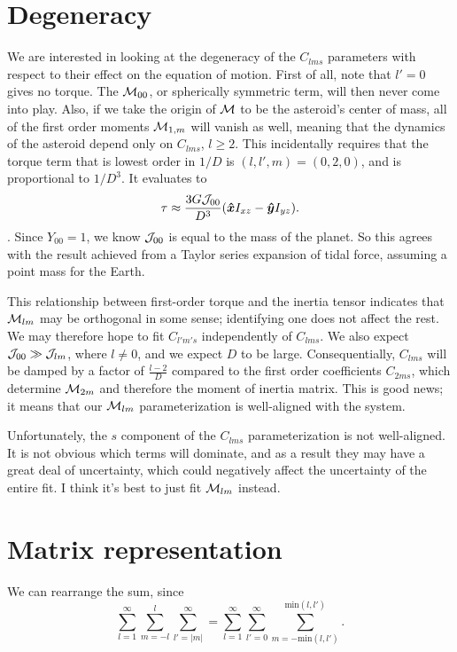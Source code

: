\documentclass[aps,twocolumn,secnumarabic,balancelastpage,amsmath,amssymb,nofootinbib,floatfix]{revtex4-1}
\begin{document}
\section{Degeneracy}
We are interested in looking at the degeneracy of the $C_{lms}$ parameters with respect to their effect on the equation of motion. First of all, note that $l'=0$ gives no torque. The $\mathcal{M}_{00}$, or spherically symmetric term, will then never come into play. Also, if we take the origin of $\mathcal{M}$ to be the asteroid's center of mass, all of the first order moments $\mathcal{M}_{1,m}$ will vanish as well, meaning that the dynamics of the asteroid depend only on $C_{lms}$, $l\geq 2$. This incidentally requires that the torque term that is lowest order in $1/D$ is $(l,l',m)=(0,2,0)$, and is proportional to $1/D^3.$ It evaluates to
$$\tau \approx \frac{3G\mathcal{J}_{00}}{D^3}(\bm{\hat x} I_{xz}-\bm{\hat y} I_{yz}).$$
. Since $Y_{00}=1$, we know $\mathcal{J}_{00}$ is equal to the mass of the planet. So this agrees with the result achieved from a Taylor series expansion of tidal force, assuming a point mass for the Earth.

This relationship between first-order torque and the inertia tensor indicates that $\mathcal{M}_{lm}$ may be orthogonal in some sense; identifying one does not affect the rest. We may therefore hope to fit $C_{l'm's}$ independently of $C_{lms}$. We also expect $\mathcal{J}_{00}\gg \mathcal{J}_{lm}$, where $l\neq 0$, and we expect $D$ to be large. Consequentially, $C_{lms}$ will be damped by a factor of $\frac{l-2}{D}$ compared to the first order coefficients $C_{2ms}$, which determine $\mathcal{M}_{2m}$ and therefore the moment of inertia matrix. This is good news; it means that our $\mathcal{M}_{lm}$ parameterization is well-aligned with the system.

Unfortunately, the $s$ component of the $C_{lms}$ parameterization is not well-aligned. It is not obvious which terms will dominate, and as a result they may have a great deal of uncertainty, which could negatively affect the uncertainty of the entire fit. I think it's best to just fit $\mathcal{M}_{lm}$ instead.


\clearpage


\section{Matrix representation}
We can rearrange the sum, since
$$\sum_{l=1}^\infty \sum_{m=-l}^l\sum_{l'=|m|}^\infty = \sum_{l=1}^\infty \sum_{l'=0}^\infty \sum_{m=-\text{min}(l,l')}^{\text{min}(l,l')}.$$
\end{document}

